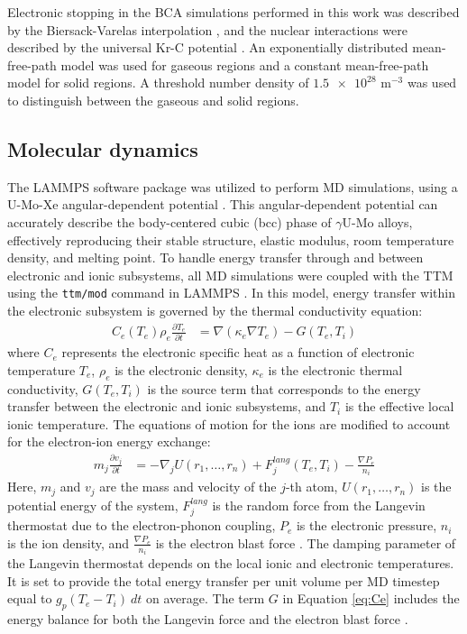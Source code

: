 \documentclass[review]{elsarticle}
\begin{document}
Electronic stopping in the BCA simulations performed in this work was described by the Biersack-Varelas interpolation \cite{varelas1970}, and the nuclear interactions were described by the universal Kr-C potential \cite{moller1984, eckstein2013}. An exponentially distributed mean-free-path model was used for gaseous regions and a constant mean-free-path model for solid regions. A threshold number density of $\num{1.5e28}$ m$^{-3}$ was used to distinguish between the gaseous and solid regions.

\subsection{Molecular dynamics}

The LAMMPS software package \cite{lammps} was utilized to perform MD simulations, using a U-Mo-Xe angular-dependent potential \cite{smirnova2013, starikov2018, beelerADP}. This angular-dependent potential can accurately describe the body-centered cubic (bcc) phase of $\gamma$U-Mo alloys, effectively reproducing their stable structure, elastic modulus, room temperature density, and melting point. To handle energy transfer through and between electronic and ionic subsystems, all MD simulations were coupled with the TTM using the \texttt{ttm/mod} command in LAMMPS \cite{norman2013, pisarev2014}. In this model, energy transfer within the electronic subsystem is governed by the thermal conductivity equation:
\begin{align}
	C_e (T_e) \rho_e \frac{\partial T_e}{\partial t}
		&= \nabla (\kappa_e \nabla T_e) - G (T_e, T_i)
	\label{eq:Ce}
\end{align}
where $C_e$ represents the electronic specific heat as a function of electronic temperature $T_e$, $\rho_e$ is the electronic density, $\kappa_e$ is the electronic thermal conductivity, $G (T_e, T_i)$ is the source term that corresponds to the energy transfer between the electronic and ionic subsystems, and $T_i$ is the effective local ionic temperature. The equations of motion for the ions are modified to account for the electron-ion energy exchange:
\begin{align}
	m_j \frac{\partial v_j}{\partial t}
		&= - \nabla_j U (r_1, \ldots, r_n)
		+ F_j^{lang} (T_e, T_i) - \frac{\nabla P_e}{n_i}
\end{align}
Here, $m_j$ and $v_j$ are the mass and velocity of the $j$-th atom, $U (r_1, \dots, r_n)$ is the potential energy of the system, $F_j^{lang}$ is the random force from the Langevin thermostat due to the electron-phonon coupling, $P_e$ is the electronic pressure, $n_i$ is the ion density, and $\frac{\nabla P_e}{n_i}$ is the electron blast force \cite{chen2006, norman2013}. The damping parameter of the Langevin thermostat depends on the local ionic and electronic temperatures. It is set to provide the total energy transfer per unit volume per MD timestep equal to $g_p (T_e - T_i) \: dt$ on average. The term $G$ in Equation \ref{eq:Ce} includes the energy balance for both the Langevin force and the electron blast force \cite{duffy2006, rutherford2007, norman2013, pisarev2014, kolotova2017}.
\end{document}
